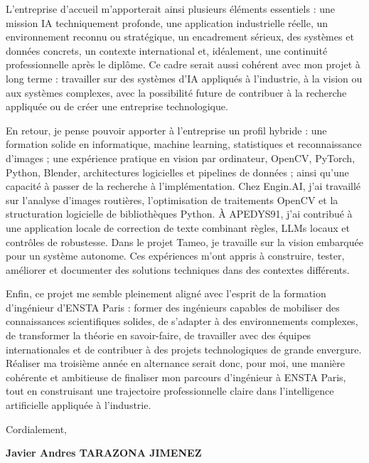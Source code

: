 \documentclass[10pt,a4paper]{article}
\begin{document}
{L’entreprise d’accueil m’apporterait ainsi plusieurs éléments essentiels : une mission IA techniquement profonde, une application industrielle réelle, un environnement reconnu ou stratégique, un encadrement sérieux, des systèmes et données concrets, un contexte international et, idéalement, une continuité professionnelle après le diplôme. Ce cadre serait aussi cohérent avec mon projet à long terme : travailler sur des systèmes d’IA appliqués à l’industrie, à la vision ou aux systèmes complexes, avec la possibilité future de contribuer à la recherche appliquée ou de créer une entreprise technologique.

En retour, je pense pouvoir apporter à l’entreprise un profil hybride : une formation solide en informatique, machine learning, statistiques et reconnaissance d’images ; une expérience pratique en vision par ordinateur, OpenCV, PyTorch, Python, Blender, architectures logicielles et pipelines de données ; ainsi qu’une capacité à passer de la recherche à l’implémentation. Chez Engin.AI, j’ai travaillé sur l’analyse d’images routières, l’optimisation de traitements OpenCV et la structuration logicielle de bibliothèques Python. À APEDYS91, j’ai contribué à une application locale de correction de texte combinant règles, LLMs locaux et contrôles de robustesse. Dans le projet Tameo, je travaille sur la vision embarquée pour un système autonome. Ces expériences m’ont appris à construire, tester, améliorer et documenter des solutions techniques dans des contextes différents.

Enfin, ce projet me semble pleinement aligné avec l’esprit de la formation d’ingénieur d’ENSTA Paris : former des ingénieurs capables de mobiliser des connaissances scientifiques solides, de s’adapter à des environnements complexes, de transformer la théorie en savoir-faire, de travailler avec des équipes internationales et de contribuer à des projets technologiques de grande envergure. Réaliser ma troisième année en alternance serait donc, pour moi, une manière cohérente et ambitieuse de finaliser mon parcours d’ingénieur à ENSTA Paris, tout en construisant une trajectoire professionnelle claire dans l’intelligence artificielle appliquée à l’industrie.

\vspace{0.8cm}

Cordialement,

\textbf{Javier Andres TARAZONA JIMENEZ}

}
\end{document}
